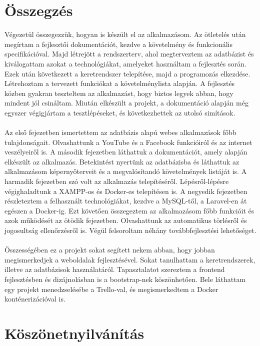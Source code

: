 \documentclass[
]{thesis-ekf}
\theoremstyle{definition}
\theoremstyle{remark}
\begin{document}
\chapter*{Összegzés}
Végezetül összegezzük, hogyan is készült el az alkalmazásom. Az ötletelés után megírtam a fejlesztői dokumentációt, kezdve a követelmény és funkcionális specifikációval. Majd létrejött a rendszerterv, ahol megterveztem az adatbázist és kiválogattam azokat a technológiákat, amelyeket használtam a fejlesztés során. Ezek után következett a keretrendszer telepítése, majd a programozás elkezdése.
Létrehoztam a tervezett funkciókat a követelménylista alapján. A fejlesztés közben gyakran teszteltem az alkalmazást, hogy biztos legyek abban, hogy mindent jól csináltam. Miután elkészült a projekt, a dokumentáció alapján még egyszer végigjártam a tesztlépéseket, és következhettek az utolsó simítások.
\\\\
Az első fejezetben ismertettem az adatbázis alapú webes alkalmazások főbb tulajdonságait. Olvashattunk a YouTube és a Facebook funkcióiról és az internet veszélyeiről is.
A második fejezetben láthattuk a dokumentációt, amely alapján elkészült az alkalmazás. Betekintést nyertünk az adatbázisba és láthattuk az alkalmazásom képernyőterveit és a megvalósítandó követelmények listáját is.
A harmadik fejezetben szó volt az alkalmazás telepítéséről. Lépésről-lépésre végighaladtunk a XAMPP-os és Docker-es telepítésen is.
A negyedik fejezetben részleteztem a felhasznált technológiákat, kezdve a MySQL-től, a Laravel-en át egészen a Docker-ig.
Ezt követően összegeztem az alkalmazásom főbb funkcióit és azok működését az ötödik fejezetben. Olvashattunk az automatikus törlésről és jogosultság ellenőrzésről is. Végül felsoroltam néhány továbbfejlesztési lehetőséget.
\\\\
Összességében ez a projekt sokat segített nekem abban, hogy jobban megismerkedjek a weboldalak fejlesztésével. Sokat tanulhattam a keretrendszerek, illetve az adatbázisok használatáról. Tapasztalatot szereztem a frontend fejlesztésben és dizájnolásban is a bootstrap-nek köszönhetően. Bele láthattam egy projekt menedzselésébe a Trello-val, és megismerkedtem a Docker konténerizációval is.

\chapter*{Köszönetnyilvánítás}
\end{document}
